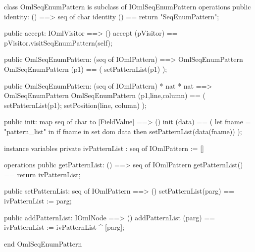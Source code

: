 \begin{vdm_al}
class OmlSeqEnumPattern is subclass of IOmlSeqEnumPattern
operations
  public identity: () ==> seq of char
  identity () == return "SeqEnumPattern";

  public accept: IOmlVisitor ==> ()
  accept (pVisitor) == pVisitor.visitSeqEnumPattern(self);

  public OmlSeqEnumPattern:
    (seq of IOmlPattern) ==> OmlSeqEnumPattern
  OmlSeqEnumPattern (p1) == 
    ( setPatternList(p1) );

  public OmlSeqEnumPattern:
    (seq of IOmlPattern) *
    nat *
    nat ==> OmlSeqEnumPattern
  OmlSeqEnumPattern (p1,line,column) == 
    ( setPatternList(p1);
      setPosition(line, column) );

  public init: map seq of char to [FieldValue] ==> ()
  init (data) ==
    ( let fname = "pattern_list" in
        if fname in set dom data
        then setPatternList(data(fname)) );

instance variables
  private ivPatternList : seq of IOmlPattern := []

operations
  public getPatternList: () ==> seq of IOmlPattern
  getPatternList() == return ivPatternList;

  public setPatternList: seq of IOmlPattern ==> ()
  setPatternList(parg) == ivPatternList := parg;

  public addPatternList: IOmlNode ==> ()
  addPatternList (parg) == ivPatternList := ivPatternList ^ [parg];

end OmlSeqEnumPattern
\end{vdm_al}

